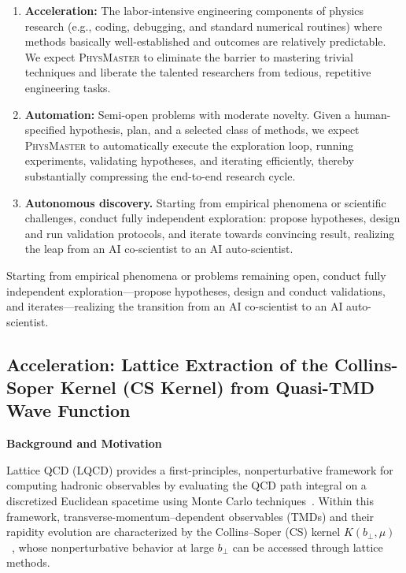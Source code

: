\documentclass[11pt, a4paper, logo, copyright, nonumbering]{SAI}
\newcommand{\agent}{\textsc{PhysMaster}\xspace}
\begin{document}
\vspace{-1.6ex}
\begin{enumerate}
    \item \textbf{Acceleration:} The labor-intensive engineering components of physics research (e.g., coding, debugging, and standard numerical routines) where methods basically well-established and outcomes are relatively predictable. We expect \agent to eliminate the barrier to mastering trivial techniques and liberate the talented researchers from tedious, repetitive engineering tasks.
    \item \textbf{Automation:} Semi-open problems with moderate novelty. Given a human-specified hypothesis, plan, and a selected class of methods, we expect \agent to automatically execute the exploration loop, running experiments, validating hypotheses, and iterating efficiently, thereby substantially compressing the end-to-end research cycle.
    \item \textbf{Autonomous discovery.} Starting from empirical phenomena or scientific challenges, conduct fully independent exploration: propose hypotheses, design and run validation protocols, and iterate towards convincing result, realizing the leap from an AI co-scientist to an AI auto-scientist.
\end{enumerate}
\vspace{-1.6ex}

Starting from empirical phenomena or problems remaining open, conduct fully independent exploration---propose hypotheses, design and conduct validations, and iterates---realizing the transition from an AI co-scientist to an AI auto-scientist.

\subsection{Acceleration: Lattice Extraction of the Collins-Soper Kernel (CS Kernel) from Quasi-TMD Wave Function}

\noindent \textbf{Background and Motivation}

Lattice QCD (LQCD) provides a first-principles, nonperturbative framework for computing
hadronic observables by evaluating the QCD path integral on a discretized Euclidean spacetime
using Monte Carlo techniques~\cite{Wilson:1974sk,Gattringer:2010zz}.
Within this framework, transverse-momentum–dependent observables (TMDs) and their rapidity
evolution are characterized by the Collins--Soper (CS) kernel $K(b_\perp,\mu)$~\cite{Collins:2011zzd},
whose nonperturbative behavior at large $b_\perp$ can be accessed through lattice methods.
\end{document}
